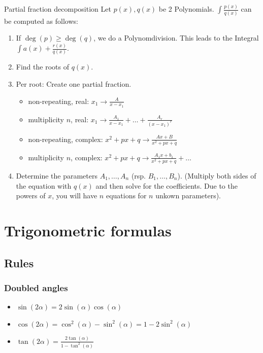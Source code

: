 \documentclass[a4paper,fontsize = 8pt]{scrartcl}
\begin{document}
\begin{mainbox}{Partial fraction decomposition}
 Let $p(x), q(x)$ be 2 Polynomials. $\int \frac{p(x)}{q(x)}$ can be computed as follows:
 \begin{enumerate}
  \item If $\deg(p) \ge \deg(q)$, we do a Polynomdivision. This leads to the Integral $\int a(x) + \frac{r(x)}{q(x)}$.
  \item Find the roots of $q(x)$.
  \item Per root: Create one partial fraction.
  \begin{itemize}[left=0pt]
   \item non-repeating, real: $x_1 \to \frac{A}{x - x_1}$
   \item multiplicity $n$, real: $x_1 \to \frac{A_1}{x - x_1} + \ldots + \frac{A_r}{(x-x_1)^r}$ 
   \item non-repeating, complex: $x^2 + px + q \to \frac{Ax + B} {x^2 + px + q}$
   \item multiplicity $n$, complex: $x^2 + px + q \to \frac{A_1x+b_1}{x^2+px+q} + \ldots$
  \end{itemize}
  \item Determine the parameters $A_1, \ldots, A_n$ (rsp. $B_1, \ldots, B_n$). 
  (Multiply both sides of the equation with $q(x)$ and then solve for the coefficients. Due to the powers of $x$, you will have $n$ equations for $n$ unkown parameters).

 \end{enumerate}
\end{mainbox}

\section{Trigonometric formulas}

\subsection{Rules}

\subsubsection{Doubled angles}
\begin{itemize}
 \item $\sin(2\alpha) = 2 \sin(\alpha) \cos(\alpha)$
 \item $\cos(2\alpha) = \cos^2(\alpha) - \sin^2(\alpha) = 1 - 2 \sin^2(\alpha)$
 \item $\tan(2\alpha) = \frac{2\tan(\alpha)}{1 - \tan^2(\alpha)}$
\end{itemize}
\end{document}
